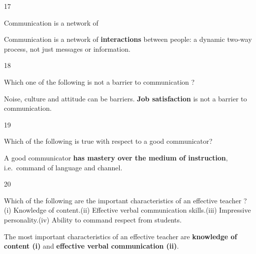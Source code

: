 \begin{question}{17}
{Communication is a network of\par}
\begin{explain}
Communication is a network of \textbf{interactions} between people: a dynamic two-way process, not just messages or information.
\end{explain}
\end{question}

\begin{question}{18}
{Which one of the following is not a barrier to communication ?\par}
\begin{explain}
Noise, culture and attitude can be barriers. \textbf{Job satisfaction} is not a barrier to communication.
\end{explain}
\end{question}

\begin{question}{19}
{Which of the following is true with respect to a good communicator?\par}
\begin{explain}
A good communicator \textbf{has mastery over the medium of instruction}, i.e.\ command of language and channel.
\end{explain}
\end{question}

\begin{question}{20}
{Which of the following are the important characteristics of an effective teacher ?\newline (i) Knowledge of content.\newline (ii) Effective verbal communication skills.\newline (iii) Impressive personality.\newline (iv) Ability to command respect from students.\par}
\begin{explain}
The most important characteristics of an effective teacher are \textbf{knowledge of content (i)} and \textbf{effective verbal communication (ii)}.
\end{explain}
\end{question}

